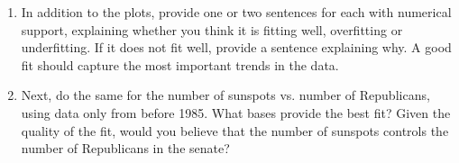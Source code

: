 \documentclass[submit]{harvardml}
\begin{document}
\begin{problem}
\begin{enumerate}
\item In addition to the plots, provide one or two sentences for each with
numerical support, explaining whether you think it is fitting well,
overfitting or underfitting.  If it does not fit well, provide a
sentence explaining why. A good fit should capture the most important
trends in the data.

\item Next, do the same for the number of sunspots vs. number of
Republicans, using data only from before 1985.  What bases provide the
best fit?  Given the quality of the fit, would you believe that the
number of sunspots controls the number of Republicans in the senate?

\end{enumerate}

\end{problem}
\end{document}
